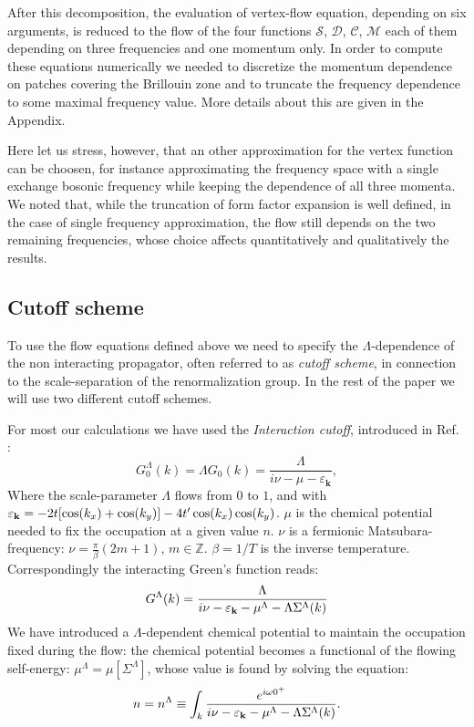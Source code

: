 After this decomposition, the evaluation of vertex-flow equation, depending on six arguments, is reduced to the flow of the four functions $\mathcal{S}$, $\mathcal{D}$, $\mathcal{C}$, $\mathcal{M}$ 
each of them depending on three frequencies and one momentum only. In order to compute these equations numerically we needed to discretize the momentum 
dependence on patches covering the Brillouin zone and to truncate the frequency dependence to some maximal frequency value. More details about this are given in the Appendix. 

Here let us stress, however, that an other approximation for the vertex function can be choosen, for instance approximating the frequency space with a single exchange bosonic frequency 
while keeping the dependence of all three momenta. We noted that, while the truncation of form factor expansion is well defined, in the case of single frequency approximation, the 
flow still depends on the two remaining frequencies, whose choice affects quantitatively and qualitatively the results.


\subsection{Cutoff scheme}
To use the flow equations defined above we need to specify the $\Lambda$-dependence of the non interacting propagator, often referred to as \textit{cutoff scheme}, in connection 
to the scale-separation of the renormalization group. 
In the rest of the paper we will use two different cutoff schemes. 
 
 For most our calculations we have used the \textit{Interaction cutoff}, introduced in Ref. : 
 \begin{equation}
 G_0^\Lambda(k) = \Lambda G_0(k)=\frac{\Lambda}{i\nu-\mu-\varepsilon_{\mathbf{k}} } , 
 \end{equation}
  Where the scale-parameter $\Lambda$ flows from $0$ to $1$, and  
 with $\varepsilon_{\mathbf{k}} = -2 t [\cos(k_x)+\cos(k_y)] - 4 t' \cos(k_x)\cos(k_y)$. $\mu$ is the chemical potential needed to fix the occupation at a given value $n$. $\nu$ is a fermionic Matsubara-frequency: $\nu = \frac{\pi}{\beta} (2m+1)$, $m\in \mathbb{Z}$. $\beta=1/T$ is the inverse temperature.       
Correspondingly the interacting Green's function reads: 
\begin{equation}
G^\Lambda (k) = \frac{\Lambda}{i\nu - \varepsilon_{\mathbf{k}} -\mu^\Lambda-\Lambda\Sigma^\Lambda(k)} 
\end{equation} 
We have introduced a $\Lambda$-dependent chemical potential to maintain the occupation fixed during the flow:  the chemical potential becomes a functional of the flowing self-energy: $\mu^\Lambda=\mu[\Sigma^\Lambda]$, whose value is found by solving the equation:  
\begin{equation}
n = n^{\Lambda} \equiv \int_k \frac{e^{i\omega 0^{+}}} {i\nu - \varepsilon_{\mathbf{k}} -\mu^\Lambda-\Lambda\Sigma^\Lambda(k)}. 
\end{equation}  

